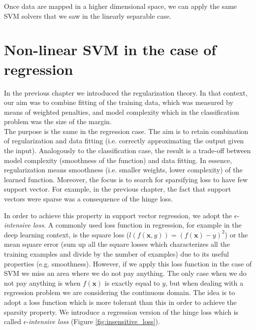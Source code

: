 Once data are mapped in a higher dimensional space, we can apply the same SVM solvers that we saw in the linearly separable case.

\section{Non-linear SVM in the case of regression}
In the previous chapter we introduced the regularization theory. In that context, our aim was to combine fitting of the training data, which was measured by means of weighted penalties, and model complexity which in the classification problem was the size of the margin.\\
The purpose is the same in the regression case. The aim is to retain combination of regularization and data fitting (i.e. correctly approximating the output given the input). Analogously to the classification case, the result is a trade-off between model complexity (smoothness of the function) and data fitting. In essence, regularization means smoothness (i.e. smaller weights, lower complexity) of the learned function. Moreover, the focus is to search for sparsifying loss to have few support vector. For example, in the previous chapter, the fact that support vectors were sparse was a consequence of the hinge loss. \newline

In order to achieve this property in support vector regression, we adopt the $\epsilon$-\textit{intensive loss}. A commonly used loss function in regression, for example in the deep learning context, is the square loss ($l(f(\pmb{x}, y)) = (f(\pmb{x})-y)^2$) or the mean square error (sum up all the square losses which characterizes all the training examples and divide by the number of examples) due to its useful properties (e.g. smoothness). However, if we apply this loss function in the case of SVM we miss an area where we do not pay anything. The only case when we do not pay anything is when $f(\pmb{x})$ is exactly equal to $y$, but when dealing with a regression problem we are considering the continuous domain. The idea is to adopt a loss function which is more tolerant than this in order to achieve the sparsity property. We introduce a regression version of the hinge loss which is called $\epsilon$-\textit{intensive loss} (Figure \ref{fig:insensitive_loss}).


